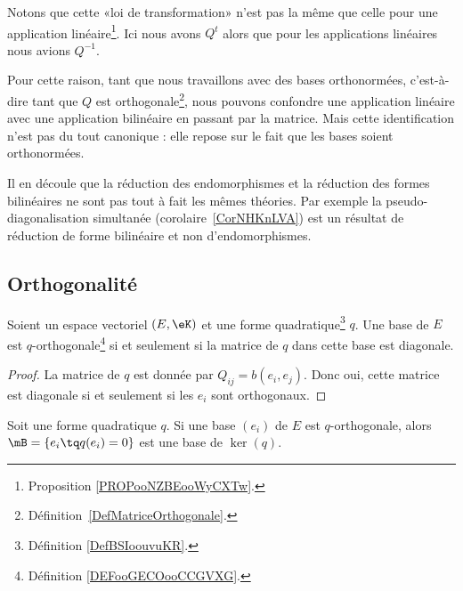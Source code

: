 \begin{remark}      \label{REMooNEJLooSqgeih}
	Notons que cette «loi de transformation» n'est pas la même que celle pour une application linéaire\footnote{Proposition \ref{PROPooNZBEooWyCXTw}.}. Ici nous avons \( Q^t\) alors que pour les applications linéaires nous avions \( Q^{-1}\).

	Pour cette raison, tant que nous travaillons avec des bases orthonormées, c'est-à-dire tant que \( Q\) est orthogonale\footnote{Définition~\ref{DefMatriceOrthogonale}.}, nous pouvons confondre une application linéaire avec une application bilinéaire en passant par la matrice. Mais cette identification n'est pas du tout canonique : elle repose sur le fait que les bases soient orthonormées.

	Il en découle que la réduction des endomorphismes et la réduction des formes bilinéaires ne sont pas tout à fait les mêmes théories. Par exemple la pseudo-diagonalisation simultanée (corolaire~\ref{CorNHKnLVA}) est un résultat de réduction de forme bilinéaire et non d'endomorphismes.
\end{remark}

\subsection{Orthogonalité}

\begin{proposition}       \label{PROPooYXMMooYIuGRd}
	Soient un espace vectoriel \( (E,\eK)\) et une forme quadratique\footnote{Définition \ref{DefBSIoouvuKR}.} \( q\). Une base de \( E\) est \( q\)-orthogonale\footnote{Définition \ref{DEFooGECOooCCGVXG}.} si et seulement si la matrice de \( q\) dans cette base est diagonale.
\end{proposition}

\begin{proof}
	La matrice de \( q\) est donnée par \( Q_{ij}=b(e_i,e_j)\). Donc oui, cette matrice est diagonale si et seulement si les \( e_i\) sont orthogonaux.
\end{proof}

\begin{proposition}
	Soit une forme quadratique \( q\). Si une base \( (e_i )\) de \( E\) est \( q\)-orthogonale, alors \( \mB=\{ e_i\tq q(e_i)=0 \}\) est une base de \( \ker(q)\).
\end{proposition}


